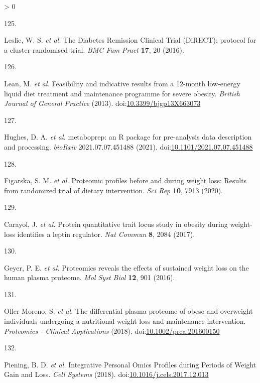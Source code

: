 \documentclass[11pt,twoside]{bristolthesis}
\newlength{\cslhangindent}
\newlength{\csllabelwidth}
\newenvironment{CSLReferences}[2] %
 {%
  \setlength{\parindent}{0pt}
  \ifodd #1 \everypar{\setlength{\hangindent}{\cslhangindent}}\ignorespaces\fi
  \ifnum #2 > 0
  \setlength{\parskip}{#2\baselineskip}
  \fi
 }%
 {}
\newcommand{\CSLLeftMargin}[1]{\parbox[t]{\csllabelwidth}{#1}}
\newcommand{\CSLRightInline}[1]{\parbox[t]{\linewidth - \csllabelwidth}{#1}\break}
\begin{document}
\begin{CSLReferences}{0}{0}
\leavevmode\hypertarget{ref-Leslie2016}{}%
\CSLLeftMargin{125. }
\CSLRightInline{Leslie, W. S. \emph{et al.} {The Diabetes Remission Clinical Trial (DiRECT): protocol for a cluster randomised trial}. \emph{BMC Fam Pract} \textbf{17}, 20 (2016).}

\leavevmode\hypertarget{ref-Lean2013}{}%
\CSLLeftMargin{126. }
\CSLRightInline{Lean, M. \emph{et al.} {Feasibility and indicative results from a 12-month low-energy liquid diet treatment and maintenance programme for severe obesity}. \emph{British Journal of General Practice} (2013). doi:\href{https://doi.org/10.3399/bjgp13X663073}{10.3399/bjgp13X663073}}

\leavevmode\hypertarget{ref-Hughes2021}{}%
\CSLLeftMargin{127. }
\CSLRightInline{Hughes, D. A. \emph{et al.} {metaboprep: an R package for pre-analysis data description and processing}. \emph{bioRxiv} 2021.07.07.451488 (2021). doi:\href{https://doi.org/10.1101/2021.07.07.451488}{10.1101/2021.07.07.451488}}

\leavevmode\hypertarget{ref-Figarska2020}{}%
\CSLLeftMargin{128. }
\CSLRightInline{Figarska, S. M. \emph{et al.} {Proteomic profiles before and during weight loss: Results from randomized trial of dietary intervention}. \emph{Sci Rep} \textbf{10}, 7913 (2020).}

\leavevmode\hypertarget{ref-Carayol2017}{}%
\CSLLeftMargin{129. }
\CSLRightInline{Carayol, J. \emph{et al.} {Protein quantitative trait locus study in obesity during weight-loss identifies a leptin regulator}. \emph{Nat Commun} \textbf{8}, 2084 (2017).}

\leavevmode\hypertarget{ref-Geyer2016}{}%
\CSLLeftMargin{130. }
\CSLRightInline{Geyer, P. E. \emph{et al.} {Proteomics reveals the effects of sustained weight loss on the human plasma proteome}. \emph{Mol Syst Biol} \textbf{12}, 901 (2016).}

\leavevmode\hypertarget{ref-OllerMoreno2018}{}%
\CSLLeftMargin{131. }
\CSLRightInline{Oller Moreno, S. \emph{et al.} {The differential plasma proteome of obese and overweight individuals undergoing a nutritional weight loss and maintenance intervention}. \emph{Proteomics - Clinical Applications} (2018). doi:\href{https://doi.org/10.1002/prca.201600150}{10.1002/prca.201600150}}

\leavevmode\hypertarget{ref-Piening2018}{}%
\CSLLeftMargin{132. }
\CSLRightInline{Piening, B. D. \emph{et al.} {Integrative Personal Omics Profiles during Periods of Weight Gain and Loss}. \emph{Cell Systems} (2018). doi:\href{https://doi.org/10.1016/j.cels.2017.12.013}{10.1016/j.cels.2017.12.013}}


\end{CSLReferences}
\end{document}

